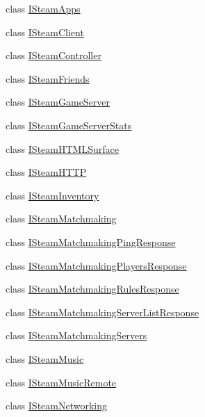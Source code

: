 \begin{DoxyCompactItemize}
\item 
class \hyperlink{class_valve_1_1_steamworks_1_1_i_steam_apps}{I\+Steam\+Apps}
\item 
class \hyperlink{class_valve_1_1_steamworks_1_1_i_steam_client}{I\+Steam\+Client}
\item 
class \hyperlink{class_valve_1_1_steamworks_1_1_i_steam_controller}{I\+Steam\+Controller}
\item 
class \hyperlink{class_valve_1_1_steamworks_1_1_i_steam_friends}{I\+Steam\+Friends}
\item 
class \hyperlink{class_valve_1_1_steamworks_1_1_i_steam_game_server}{I\+Steam\+Game\+Server}
\item 
class \hyperlink{class_valve_1_1_steamworks_1_1_i_steam_game_server_stats}{I\+Steam\+Game\+Server\+Stats}
\item 
class \hyperlink{class_valve_1_1_steamworks_1_1_i_steam_h_t_m_l_surface}{I\+Steam\+H\+T\+M\+L\+Surface}
\item 
class \hyperlink{class_valve_1_1_steamworks_1_1_i_steam_h_t_t_p}{I\+Steam\+H\+T\+TP}
\item 
class \hyperlink{class_valve_1_1_steamworks_1_1_i_steam_inventory}{I\+Steam\+Inventory}
\item 
class \hyperlink{class_valve_1_1_steamworks_1_1_i_steam_matchmaking}{I\+Steam\+Matchmaking}
\item 
class \hyperlink{class_valve_1_1_steamworks_1_1_i_steam_matchmaking_ping_response}{I\+Steam\+Matchmaking\+Ping\+Response}
\item 
class \hyperlink{class_valve_1_1_steamworks_1_1_i_steam_matchmaking_players_response}{I\+Steam\+Matchmaking\+Players\+Response}
\item 
class \hyperlink{class_valve_1_1_steamworks_1_1_i_steam_matchmaking_rules_response}{I\+Steam\+Matchmaking\+Rules\+Response}
\item 
class \hyperlink{class_valve_1_1_steamworks_1_1_i_steam_matchmaking_server_list_response}{I\+Steam\+Matchmaking\+Server\+List\+Response}
\item 
class \hyperlink{class_valve_1_1_steamworks_1_1_i_steam_matchmaking_servers}{I\+Steam\+Matchmaking\+Servers}
\item 
class \hyperlink{class_valve_1_1_steamworks_1_1_i_steam_music}{I\+Steam\+Music}
\item 
class \hyperlink{class_valve_1_1_steamworks_1_1_i_steam_music_remote}{I\+Steam\+Music\+Remote}
\item 
class \hyperlink{class_valve_1_1_steamworks_1_1_i_steam_networking}{I\+Steam\+Networking}

\end{DoxyCompactItemize}
